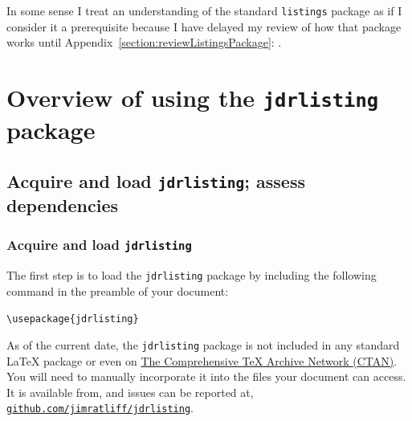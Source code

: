 \documentclass[12pt,table,final]{article}%
\begin{document}
In some sense I treat an understanding of the standard \lstinline|listings| package as if I consider it a prerequisite because I have delayed my review of how that package works until Appendix~\ref{section:reviewListingsPackage}: .

\FloatBarrier

\section{Overview of using the \lstinline|jdrlisting| package}
\label{section:overviewUsingJdrlisting}
\subsection{Acquire and load \lstinline|jdrlisting|; assess dependencies}
\label{section:acquireLoadAssessDependencies}
\subsubsection{Acquire and load \lstinline|jdrlisting|}
\label{section:loadPackage}
The first step is to load the \lstinline|jdrlisting| package by including the following command in the preamble of your document:
\begin{jdrCodeSnip}
\lstinline|\usepackage{jdrlisting}|
\end{jdrCodeSnip}


As of the current date, the \lstinline|jdrlisting| package is not included in any standard \LaTeX{} package or even on \href{https://ctan.org}{The Comprehensive \TeX{} Archive Network (CTAN)}. You will need to manually incorporate it into the files your document can access. It is available from, and issues can be reported at, \href{https://github.com/jimratliff/jdrlisting}{\texttt{github.com/jimratliff/jdrlisting}}.
\end{document}
